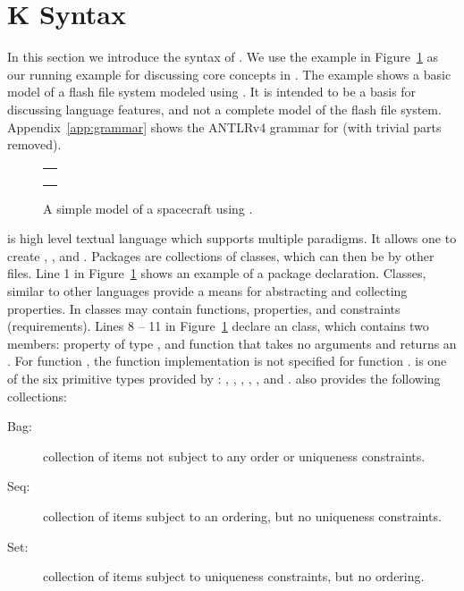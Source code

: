 \section{K Syntax}
\label{sec:k-syntax}

In this section we introduce the syntax of \Klang{}. We use the
\Klang{} example in Figure~\ref{fig:fs} as our running example for
discussing core concepts in \Klang{}. The example shows a basic model
of a flash file system modeled using \Klang{}. It is intended to be a
basis for discussing language features, and not a complete model of
the flash file system. Appendix~\ref{app:grammar} shows the ANTLRv4
grammar for \Klang{} (with trivial parts removed).

\begin{figure}
\centering
\begin{tabular}{c}
\hline \\
 \\ \\
\hline
\end{tabular}
\caption{A simple model of a spacecraft using \Klang{}.}
\label{fig:fs}
\end{figure}

\Klang{} is high level textual language which supports multiple
paradigms. It allows one to create , ,
and . Packages are collections of classes, which can
then be  by other \Klang{} files. Line 1 in
Figure~\ref{fig:fs} shows an example of a package
declaration. Classes, similar to other languages provide a means for
abstracting and collecting properties. In \Klang{} classes may contain
functions, properties, and constraints (requirements). Lines 8 -- 11
in Figure~\ref{fig:fs} declare an  class, which contains
two members: property  of type , and function
 that takes no arguments and returns an . For
function , the function implementation is not specified for
function .  is one of the six primitive types
provided by \Klang{}: , , ,
, , and . \Klang{} also provides
the following collections:

\begin{description}
\item [Bag:] collection of items not subject to any order
  or uniqueness constraints.
\item [Seq:] collection of items subject to an ordering, but
  no uniqueness constraints.
\item [Set:] collection of items subject to uniqueness
  constraints, but no ordering.
\end{description}

